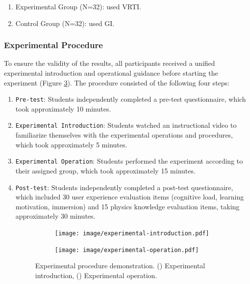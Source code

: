 \documentclass[runningheads]{llncs}
\begin{document}
\begin{enumerate}
  \item Experimental Group (N=32): used VRTI.

  \item Control Group (N=32): used GI.
\end{enumerate}

\subsubsection{Experimental Procedure}
To ensure the validity of the results, all participants received a unified experimental introduction and operational guidance before starting the experiment (Figure \ref{fig:experimental-procedure}). The procedure consisted of the following four steps:

\begin{enumerate}
\item {\texttt{Pre-test}}: Students independently completed a pre-test questionnaire, which took approximately 10 minutes.

\item {\texttt{Experimental Introduction}}: Students watched an instructional video to familiarize themselves with the experimental operations and procedures, which took approximately 5 minutes.

\item {\texttt{Experimental Operation}}: Students performed the experiment according to their assigned group, which took approximately 15 minutes.

\item {\texttt{Post-test}}: Students independently completed a post-test questionnaire, which included 30 user experience evaluation items (cognitive load, learning motivation, immersion) and 15 physics knowledge evaluation items, taking approximately 30 minutes.

\begin{figure}
  \begin{subfigure}{0.48\linewidth} %
    \centering
    \texttt{[image: image/experimental-introduction.pdf]}
    \caption{} %
    \label{fig:experimental-introduction}
  \end{subfigure}
  \hfill %
  \begin{subfigure}{0.48\linewidth} %
    \centering
    \texttt{[image: image/experimental-operation.pdf]}
    \caption{} %
    \label{fig:experimental-operation}
  \end{subfigure}
  \caption{Experimental procedure demonstration. () Experimental introduction, () Experimental operation.}
  \label{fig:experimental-procedure}
\end{figure}

\end{enumerate}
\end{document}
